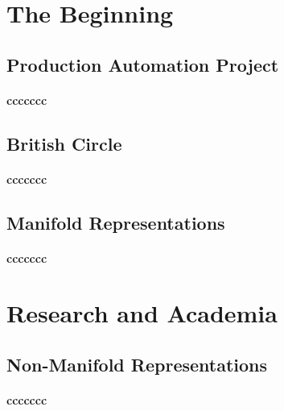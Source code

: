 \section{The Beginning}
\label{sec:1}



\subsection{Production Automation Project}
\label{subsec:1}


\paragraph{ccccccc}




\subsection{British Circle}
\label{subsec:2:style}



\paragraph{ccccccc}



\subsection{Manifold Representations}
\label{subsec:2:style}



\paragraph{ccccccc}



\section{Research and Academia}
\label{sec:2}


\subsection{Non-Manifold Representations}
\label{subsec:2:style}


\paragraph{ccccccc}



